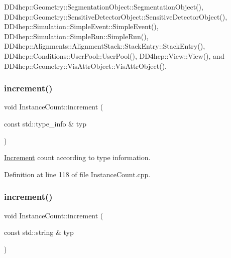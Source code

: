 D\+D4hep\+::\+Geometry\+::\+Segmentation\+Object\+::\+Segmentation\+Object(), D\+D4hep\+::\+Geometry\+::\+Sensitive\+Detector\+Object\+::\+Sensitive\+Detector\+Object(), D\+D4hep\+::\+Simulation\+::\+Simple\+Event\+::\+Simple\+Event(), D\+D4hep\+::\+Simulation\+::\+Simple\+Run\+::\+Simple\+Run(), D\+D4hep\+::\+Alignments\+::\+Alignment\+Stack\+::\+Stack\+Entry\+::\+Stack\+Entry(), D\+D4hep\+::\+Conditions\+::\+User\+Pool\+::\+User\+Pool(), D\+D4hep\+::\+View\+::\+View(), and D\+D4hep\+::\+Geometry\+::\+Vis\+Attr\+Object\+::\+Vis\+Attr\+Object().

\hypertarget{struct_d_d4hep_1_1_instance_count_a615e3109fee2bdd67d047d4decca1c0f}{}\label{struct_d_d4hep_1_1_instance_count_a615e3109fee2bdd67d047d4decca1c0f} 
\subsubsection{\texorpdfstring{increment()}{increment()}\hspace{0.1cm}{\footnotesize\ttfamily [2/3]}}
{\footnotesize\ttfamily void Instance\+Count\+::increment (\begin{DoxyParamCaption}\item[{const std\+::type\+\_\+info \&}]{typ }\end{DoxyParamCaption})\hspace{0.3cm}{\ttfamily [static]}}



\hyperlink{struct_d_d4hep_1_1_increment}{Increment} count according to type information. 



Definition at line 118 of file Instance\+Count.\+cpp.

\hypertarget{struct_d_d4hep_1_1_instance_count_a2a6c1324b3462dcd26a7916d6b1ece46}{}\label{struct_d_d4hep_1_1_instance_count_a2a6c1324b3462dcd26a7916d6b1ece46} 
\subsubsection{\texorpdfstring{increment()}{increment()}\hspace{0.1cm}{\footnotesize\ttfamily [3/3]}}
{\footnotesize\ttfamily void Instance\+Count\+::increment (\begin{DoxyParamCaption}\item[{const std\+::string \&}]{typ }\end{DoxyParamCaption})\hspace{0.3cm}{\ttfamily [static]}}



